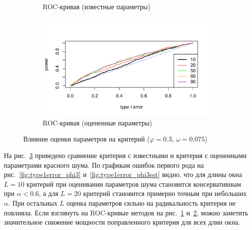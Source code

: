 \documentclass[specialist,
substylefile = spbu_report.rtx,
subf,href,colorlinks=true, 12pt]{disser}
\theoremstyle{definition}
\begin{document}
\begin{figure}[h!]
\begin{subfigure}[t]{0.5\textwidth}
		\caption{ROC-кривая (известные параметры)}
		\label{fig:roc_phi3_omega0075}
	\end{subfigure}\hspace{\fill}
	\begin{subfigure}[t]{0.5\textwidth}
		\centering
		\includegraphics[width=\textwidth]{img/roc_phi3est_omega0075.pdf}
		\caption{ROC-кривая (оцененные параметры)}
		\label{fig:roc_phi3est_omega0075}
	\end{subfigure}
	\caption{Влияние оценки параметров на критерий ($\varphi=0.3$, $\omega=0.075$)}
	\label{fig:phi3est}
\end{figure}

На рис.~\ref{fig:phi3est} приведено сравнение критерия с известными и критерия с оцененными параметрами красного шума. По графикам ошибок первого рода на рис.~\ref{fig:type1error_phi3} и~\ref{fig:type1error_phi3est} видно, что для длины окна $L=10$ критерий при оценивании параметров шума становится консервативным при $\alpha<0.6$, а для $L=20$ критерий становится примерно точным при небольших $\alpha$. При остальных $L$ оценка параметров сильно на радикальность критерия не повлияла. Если взглянуть на ROC-кривые методов на рис.~\ref{fig:roc_phi3_omega0075} и~\ref{fig:roc_phi3est_omega0075}, можно заметить значительное снижение мощности поправленного критерия для всех длин окна.
\end{document}
